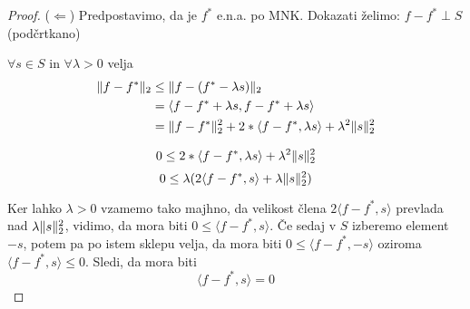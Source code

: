 \documentclass[a4paper,12pt]{article}
\DeclarePairedDelimiter\norm{\lVert}{\rVert}
\newcommand{\innerproduct}[2]{\langle #1, #2 \rangle}
\theoremstyle{definition}
\theoremstyle{remark}
\begin{document}
\begin{proof}
    ($\Longleftarrow$)
    Predpostavimo, da je $f^*$ e.n.a. po MNK.
    Dokazati želimo: $f - f^* \perp S$ (podčrtkano)

    $\forall s \in S \text{ in } \forall \lambda > 0$ velja
    \begin{align}
        \norm{f - f^*}_2 &\leq \norm{f - (f^* - \lambda s)}_2\\
                         &= \innerproduct{f - f^* + \lambda s}{f - f^* + \lambda s}\\
                         &= \norm{f-f^*}_2^2 + 2 * \innerproduct{f - f^*}{\lambda s} + \lambda^2 \norm{s}_2^2
    \end{align}

    \[0 \leq 2 * \innerproduct{f - f^*}{\lambda s} + \lambda^2 \norm{s}_2^2\]
    \[0 \leq \lambda (2\innerproduct{f-f^*}{s} + \lambda \norm{s}_2^2)\]

    Ker lahko $\lambda > 0$ vzamemo tako majhno, da velikost člena $2\innerproduct{f-f^*}{s}$ prevlada nad $\lambda \norm{s}_2^2$, vidimo,
    da mora biti $0 \leq \innerproduct{f-f^*}{s}$. Če sedaj v $S$ izberemo element $-s$, potem pa po istem sklepu velja, da mora biti
    $0 \leq \innerproduct{f - f^*}{-s}$ oziroma $\innerproduct{f - f^*}{s} \leq 0$. Sledi, da mora biti
    \begin{equation}
        \innerproduct{f - f^*}{s} = 0
    \end{equation}
\end{proof}
\end{document}
